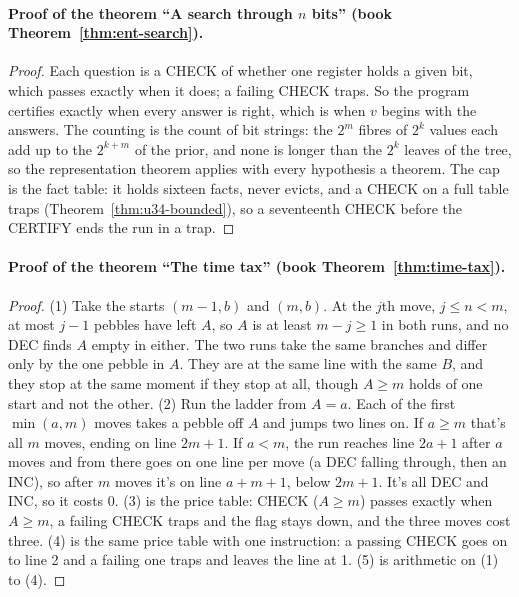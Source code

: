 \documentclass[11pt,twoside]{article}
\theoremstyle{thielethm}
\theoremstyle{thieledef}
\theoremstyle{thieledef}
\theoremstyle{thieledef}
\theoremstyle{thielethm}
\theoremstyle{thieleobs}
\theoremstyle{thielethm}
\begin{document}
\paragraph{Proof of the theorem ``A search through $n$ bits'' (book Theorem~\ref{thm:ent-search}).}
\begin{proof}
Each question is a CHECK of whether one register holds a given bit, which passes exactly when it
does; a failing CHECK traps. So the program certifies exactly when every answer is right, which is
when $v$ begins with the answers. The counting is the count of bit strings: the $2^m$ fibres of
$2^k$ values each add up to the $2^{k+m}$ of the prior, and none is longer than the $2^k$ leaves of
the tree, so the representation theorem applies with every hypothesis a theorem. The cap is the fact table: it holds sixteen facts,
never evicts, and a CHECK on a full table traps (Theorem~\ref{thm:u34-bounded}), so a seventeenth
CHECK before the CERTIFY ends the run in a trap.
\end{proof}

\paragraph{Proof of the theorem ``The time tax'' (book Theorem~\ref{thm:time-tax}).}
\begin{proof}
(1) Take the starts $(m - 1, b)$ and $(m, b)$. At the $j$th move, $j \le n < m$, at most $j - 1$
pebbles have left $A$, so $A$ is at least $m - j \ge 1$ in both runs, and no DEC finds $A$ empty
in either. The two runs take the same branches and differ only by the one pebble in $A$. They are
at the same line with the same $B$, and they stop at the same moment if they stop at all, though
$A \ge m$ holds of one start and not the other. (2) Run the ladder from $A = a$. Each of the first
$\min(a, m)$ moves takes a pebble off $A$ and jumps two lines on. If $a \ge m$ that's all $m$
moves, ending on line $2m + 1$. If $a < m$, the run reaches line $2a + 1$ after $a$ moves and from
there goes on one line per move (a DEC falling through, then an INC), so after $m$ moves it's on
line $a + m + 1$, below $2m + 1$. It's all DEC and INC, so it costs 0. (3) is the price
table: CHECK ($A \ge m$) passes exactly when $A \ge m$, a failing CHECK traps and the flag stays
down, and the three moves cost three. (4) is the same price table with one instruction: a passing
CHECK goes on to line 2 and a failing one traps and leaves the line at 1. (5) is arithmetic on
(1) to (4).
\end{proof}
\end{document}
